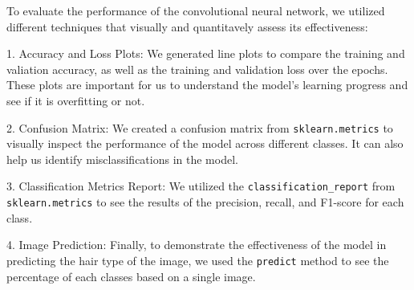 To evaluate the performance of the convolutional neural network, we utilized different techniques that visually and quantitavely assess its effectiveness:

1. Accuracy and Loss Plots: We generated line plots to compare the training and valiation accuracy, as well as the training and validation loss over the epochs. These plots are important for us to understand the model's learning progress and see if it is overfitting or not.

2. Confusion Matrix: We created a confusion matrix from \texttt{sklearn.metrics} to visually inspect the performance of the model across different classes. It can also help us identify misclassifications in the model.

3. Classification Metrics Report: We utilized the \texttt{classification\_report} from \texttt{sklearn.metrics} to see the results of the precision, recall, and F1-score for each class. 

4. Image Prediction: Finally, to demonstrate the effectiveness of the model in predicting the hair type of the image, we used the \texttt{predict} method to see the percentage of each classes based on a single image.
